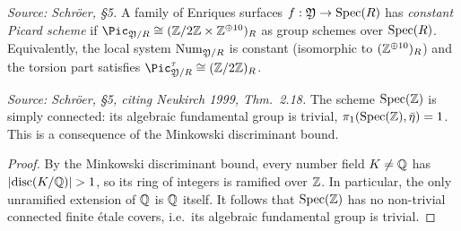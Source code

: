 \begin{definition}
  \label{def:constant-picard}
  \textit{Source: Schr\"oer, §5.}
  A family of Enriques surfaces \(f : \mathfrak{Y} \to \mathrm{Spec}(R)\) has \emph{constant Picard scheme} if
  \(\Pic_{\foY/R} \cong (\ZZ/2\ZZ \times \ZZ^{\oplus 10})_{R}\) as group schemes over \(\mathrm{Spec}(R)\).
  Equivalently, the local system \(\mathrm{Num}_{\mathfrak{Y}/R}\) is constant (isomorphic to \((\mathbb{Z}^{\oplus 10})_R\))
  and the torsion part satisfies \(\Pic^{\tau}_{\foY/R} \cong (\ZZ/2\ZZ)_{R}\).
\end{definition}

\begin{lemma}
  \label{lem:spec-Z-simply-connected}
  \uses{}
  \textit{Source: Schr\"oer, §5, citing Neukirch 1999, Thm.~2.18.}
  The scheme \(\mathrm{Spec}(\mathbb{Z})\) is simply connected: its algebraic fundamental group is trivial,
  \(\pi_1(\mathrm{Spec}(\mathbb{Z}), \bar{\eta}) = 1\).
  This is a consequence of the Minkowski discriminant bound.
\end{lemma}
\begin{proof}
  By the Minkowski discriminant bound, every number field \(K \neq \mathbb{Q}\) has
  \(|\mathrm{disc}(K/\mathbb{Q})| > 1\), so its ring of integers is ramified over \(\mathbb{Z}\).
  In particular, the only unramified extension of \(\mathbb{Q}\) is \(\mathbb{Q}\) itself.
  It follows that \(\mathrm{Spec}(\mathbb{Z})\) has no non-trivial connected finite \'etale covers,
  i.e.\ its algebraic fundamental group is trivial.
\end{proof}

